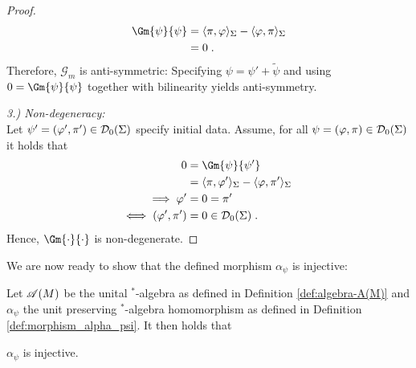 \begin{proof}
\begin{align}
\Gm{\psi}{\psi}
&=  \langle \pi , \varphi \rangle_\Sigma - \langle \varphi , \pi \rangle_\Sigma \notag\\
&= 0 \formspace.
\end{align}
Therefore, $\mathcal{G}_m$ is anti-symmetric: Specifying $\psi = \psi' + \tilde{\psi}$ and using $0=\Gm{\psi}{\psi}$ together with bilinearity  yields anti-symmetry.\par
%
\textit{3.) Non-degeneracy: \\}
Let $\psi'= (\varphi' , \pi') \in \Dzs$ specify initial data. Assume, for all $\psi = (\varphi, \pi) \in \Dzs$ it holds that
\begin{align}
0
&= \Gm{\psi}{\psi'} \notag\\
&= \langle \pi , \varphi' \rangle_\Sigma - \langle \varphi , \pi' \rangle_\Sigma \formspace \notag\\
\implies \varphi' &= 0 = \pi' \notag\\
\iff (\varphi' , \pi') &= 0 \in \Dzs\formspace.
\end{align}
Hence, $\Gm{\cdot}{\cdot}$ is non-degenerate.
\end{proof}
%
%
%
%
%
%
\newpage
We are now ready to show that the defined morphism $\alpha_\psi$ is injective:
\begin{lemma}\label{lem:alpha_is_injective}
Let $\AA(M)$ be the unital $^*$-algebra as defined in Definition \ref{def:algebra-A(M)} and $\alpha_\psi$ the unit preserving $^*$-algebra homomorphism as defined in Definition \ref{def:morphism_alpha_psi}. It then holds that
\begin{center}
$\alpha_\psi$ is injective.
\end{center}
\end{lemma}
